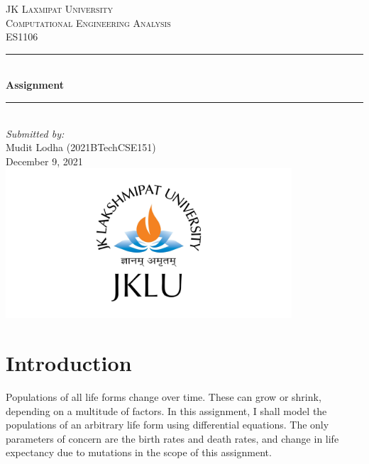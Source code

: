 \documentclass[a4paper]{article}
\begin{document}
\begin{titlepage}

\newcommand{\HRule}{\rule{\linewidth}{0.5mm}} 							%
\center 
 
\textsc{\LARGE JK Laxmipat University}\\[2cm]

\textsc{\Large Computational Engineering Analysis}\\[0.2cm]
\textsc{\large ES1106}\\[1cm] 										%
\HRule \\[0.8cm]
{ \huge \bfseries Assignment}\\[0.7cm]								%
\HRule \\[2cm]
\large
\emph{Submitted by:}\\
Mudit Lodha (2021BTechCSE151)\\[1.5cm]													%
{\large December 9, 2021}\\[3cm]
\includegraphics[width=0.8\textwidth]{Logo.jpg}\\[12cm] 	%
\vfill 
\end{titlepage}


\section*{Introduction}
Populations of all life forms change over time. These can grow or shrink, depending on a multitude of factors. In this assignment, I shall model the populations of an arbitrary life form using differential equations. The only parameters of concern are the birth rates and death rates, and change in life expectancy due to mutations in the scope of this assignment. 
\end{document}
